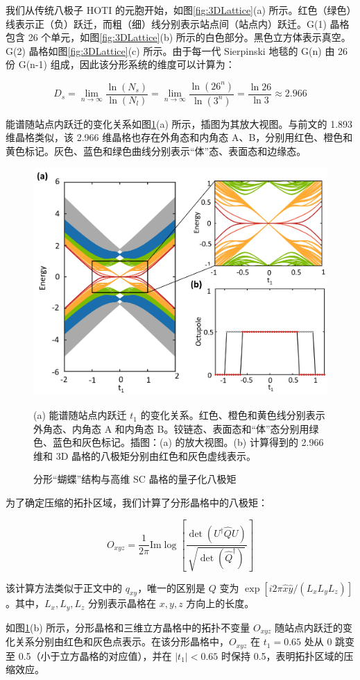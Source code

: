 我们从传统八极子 HOTI 的元胞开始，如图\ref{fig:3DLattice}(a) 所示。红色（绿色）线表示正（负）跃迁，而粗（细）线分别表示站点间（站点内）跃迁。G(1) 晶格包含 26 个单元，如图\ref{fig:3DLattice}(b) 所示的白色部分。黑色立方体表示真空。G(2) 晶格如图\ref{fig:3DLattice}(c) 所示。由于每一代 Sierpinski 地毯的 G(n) 由 26 份 G(n-1) 组成，因此该分形系统的维度可以计算为：

\begin{equation}
D_s = \lim_{n \to \infty} \frac{\ln (N_s)}{\ln (N_l)} = \lim_{n \to \infty} \frac{\ln (26^n)}{\ln (3^n)} = \frac{\ln 26}{\ln 3} \approx 2.966
\end{equation}

能谱随站点内跃迁的变化关系如图\ref{fig:3DSpec}(a) 所示，插图为其放大视图。与前文的 1.893 维晶格类似，该 2.966 维晶格也存在外角态和内角态 A、B，分别用红色、橙色和黄色标记。灰色、蓝色和绿色曲线分别表示“体”态、表面态和边缘态。
\begin{figure}[htbp]
    \centering
    \includegraphics[width=0.5\linewidth]{figure/HOTITheo/3DSpec.png}
    \caption{分形“蝴蝶”结构与高维 SC 晶格的量子化八极矩}(a) 能谱随站点内跃迁 \( t_1 \) 的变化关系。红色、橙色和黄色线分别表示外角态、内角态 A 和内角态 B。铰链态、表面态和“体”态分别用绿色、蓝色和灰色标记。插图：(a) 的放大视图。(b) 计算得到的 2.966 维和 3D 晶格的八极矩分别由红色和灰色虚线表示。
    \label{fig:3DSpec}
\end{figure}
为了确定压缩的拓扑区域，我们计算了分形晶格中的八极矩：

\begin{equation}
O_{xyz} = \frac{1}{2\pi} \text{Im} \log \left[ \frac{\det \left( U^\dagger \hat{Q} U \right)}{\sqrt{\det \left(\hat{Q}^\dagger \right)}} \right]
\end{equation}

该计算方法类似于正文中的 \( q_{xy} \)，唯一的区别是 \( Q \) 变为 \( \exp[i2\pi \hat{x} \hat{y} / (L_x L_y L_z)] \)。其中，\( L_x, L_y, L_z \) 分别表示晶格在 \( x, y, z \) 方向上的长度。

如图\ref{fig:3DSpec}(b) 所示，分形晶格和三维立方晶格中的拓扑不变量 \( O_{xyz} \) 随站点内跃迁的变化关系分别由红色和灰色点表示。在该分形晶格中，\( O_{xyz} \) 在 \( t_1 = 0.65 \) 处从 0 跳变至 0.5（小于立方晶格的对应值），并在 \( |t_1| < 0.65 \) 时保持 0.5，表明拓扑区域的压缩效应。

